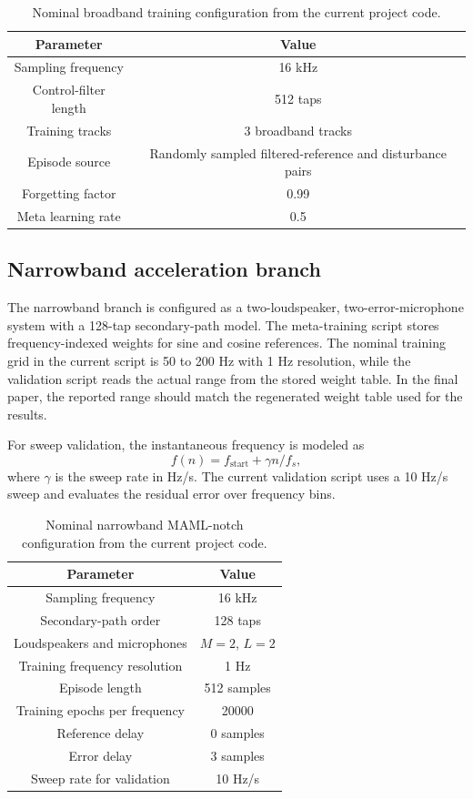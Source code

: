 \documentclass{internoise2026}
\begin{document}
\begin{table}[htbp!]
\caption{Nominal broadband training configuration from the current project code.}
\label{tab:broadband_config}
\centering
\begin{tabular}{c c}
\hline
\textbf{Parameter} & \textbf{Value} \\
\hline
Sampling frequency & 16 kHz \\
Control-filter length & 512 taps \\
Training tracks & 3 broadband tracks \\
Episode source & Randomly sampled filtered-reference and disturbance pairs \\
Forgetting factor & 0.99 \\
Meta learning rate & 0.5 \\
\hline
\end{tabular}
\end{table}

\subsection{Narrowband acceleration branch}

The narrowband branch is configured as a two-loudspeaker, two-error-microphone system with a 128-tap secondary-path model. The meta-training script stores frequency-indexed weights for sine and cosine references. The nominal training grid in the current script is 50 to 200 Hz with 1 Hz resolution, while the validation script reads the actual range from the stored weight table. In the final paper, the reported range should match the regenerated weight table used for the results.

For sweep validation, the instantaneous frequency is modeled as
\begin{equation}
  f(n)=f_{\mathrm{start}}+\gamma n/f_s,
  \label{eq:sweep}
\end{equation}
where $\gamma$ is the sweep rate in Hz/s. The current validation script uses a 10 Hz/s sweep and evaluates the residual error over frequency bins.

\begin{table}[htbp!]
\caption{Nominal narrowband MAML-notch configuration from the current project code.}
\label{tab:narrowband_config}
\centering
\begin{tabular}{c c}
\hline
\textbf{Parameter} & \textbf{Value} \\
\hline
Sampling frequency & 16 kHz \\
Secondary-path order & 128 taps \\
Loudspeakers and microphones & $M=2$, $L=2$ \\
Training frequency resolution & 1 Hz \\
Episode length & 512 samples \\
Training epochs per frequency & 20000 \\
Reference delay & 0 samples \\
Error delay & 3 samples \\
Sweep rate for validation & 10 Hz/s \\
\hline
\end{tabular}
\end{table}
\end{document}
